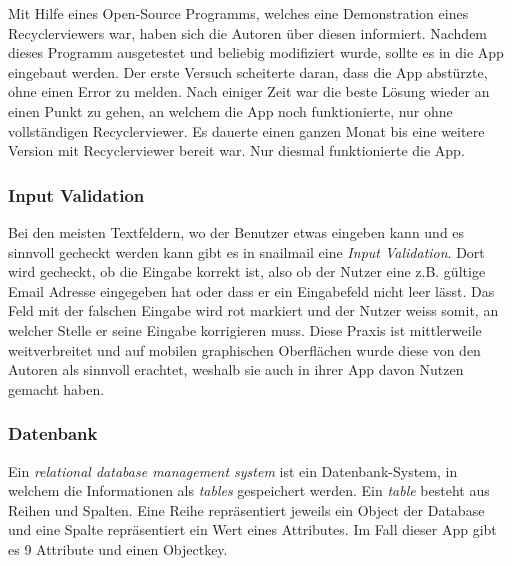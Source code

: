 \documentclass[a4paper,11pt]{article}
\begin{document}
Mit Hilfe eines Open-Source Programms, welches eine Demonstration eines Recyclerviewers war, haben sich die Autoren über diesen informiert. \cite{RecViewApp}
Nachdem dieses Programm ausgetestet und beliebig modifiziert wurde, sollte es in die App eingebaut werden. 
Der erste Versuch scheiterte daran,
dass die App abstürzte, ohne einen Error zu melden. Nach einiger Zeit war die beste Lösung wieder an einen Punkt zu gehen, an welchem die App noch funktionierte, nur ohne vollständigen 
Recyclerviewer. Es dauerte einen ganzen Monat bis eine weitere Version mit Recyclerviewer bereit war. Nur diesmal funktionierte die App. \\

\subsubsection{Input Validation}


Bei den meisten Textfeldern, wo der Benutzer etwas eingeben kann und es sinnvoll gecheckt werden kann gibt es in snailmail eine \textit{Input Validation}. Dort wird gecheckt, ob die Eingabe korrekt ist, also ob der Nutzer eine z.B. gültige Email Adresse eingegeben hat oder dass er ein Eingabefeld nicht leer lässt. Das Feld mit der falschen Eingabe wird rot markiert und der Nutzer weiss somit, an welcher Stelle er seine Eingabe korrigieren muss. Diese Praxis ist mittlerweile weitverbreitet und auf mobilen graphischen Oberflächen wurde diese von den Autoren als sinnvoll erachtet, weshalb sie auch in ihrer App davon Nutzen gemacht haben.

\subsubsection{Datenbank}


Ein \textit{relational database management system} ist ein Datenbank-System, in welchem die Informationen als \textit{tables} gespeichert werden. 
Ein \textit{table} besteht aus Reihen und Spalten. Eine Reihe repräsentiert jeweils ein Object der Database und eine Spalte repräsentiert ein Wert eines Attributes. Im Fall dieser App
gibt es 9 Attribute und einen Objectkey. \cite{riccardi2001} \\
\end{document}
